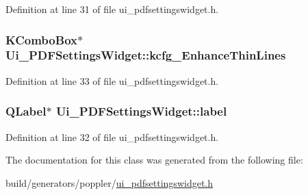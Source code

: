 Definition at line 31 of file ui\+\_\+pdfsettingswidget.\+h.

\hypertarget{classUi__PDFSettingsWidget_ad49fd3583fc2d3fb249d46949fdd23d0}{
\subsubsection[{kcfg\+\_\+\+Enhance\+Thin\+Lines}]{\setlength{\rightskip}{0pt plus 5cm}K\+Combo\+Box$\ast$ Ui\+\_\+\+P\+D\+F\+Settings\+Widget\+::kcfg\+\_\+\+Enhance\+Thin\+Lines}}\label{classUi__PDFSettingsWidget_ad49fd3583fc2d3fb249d46949fdd23d0}


Definition at line 33 of file ui\+\_\+pdfsettingswidget.\+h.

\hypertarget{classUi__PDFSettingsWidget_a330418abe746e160353aba80de5c435c}{
\subsubsection[{label}]{\setlength{\rightskip}{0pt plus 5cm}Q\+Label$\ast$ Ui\+\_\+\+P\+D\+F\+Settings\+Widget\+::label}}\label{classUi__PDFSettingsWidget_a330418abe746e160353aba80de5c435c}


Definition at line 32 of file ui\+\_\+pdfsettingswidget.\+h.



The documentation for this class was generated from the following file\+:\begin{DoxyCompactItemize}
\item 
build/generators/poppler/\hyperlink{ui__pdfsettingswidget_8h}{ui\+\_\+pdfsettingswidget.\+h}\end{DoxyCompactItemize}

